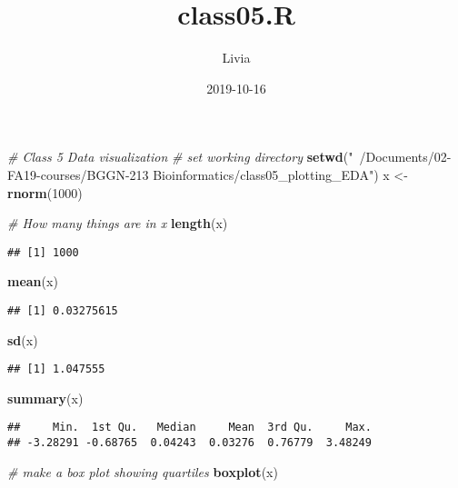 \documentclass[]{article}
\title{class05.R}
\author{Livia}
\date{2019-10-16}
\newenvironment{Shaded}{\begin{snugshade}}{\end{snugshade}}
\newcommand{\CommentTok}[1]{\textcolor[rgb]{0.56,0.35,0.01}{\textit{#1}}}
\newcommand{\DecValTok}[1]{\textcolor[rgb]{0.00,0.00,0.81}{#1}}
\newcommand{\KeywordTok}[1]{\textcolor[rgb]{0.13,0.29,0.53}{\textbf{#1}}}
\newcommand{\NormalTok}[1]{#1}
\newcommand{\StringTok}[1]{\textcolor[rgb]{0.31,0.60,0.02}{#1}}
\begin{document}
\maketitle

\begin{Shaded}
\begin{Highlighting}[]
\CommentTok{# Class 5 Data visualization}
\CommentTok{# set working directory}
\KeywordTok{setwd}\NormalTok{(}\StringTok{"~/Documents/02-FA19-courses/BGGN-213 Bioinformatics/class05_plotting_EDA"}\NormalTok{)}
\NormalTok{x <-}\StringTok{ }\KeywordTok{rnorm}\NormalTok{(}\DecValTok{1000}\NormalTok{)}

\CommentTok{# How many things are in x}
\KeywordTok{length}\NormalTok{(x)}
\end{Highlighting}
\end{Shaded}

\begin{verbatim}
## [1] 1000
\end{verbatim}

\begin{Shaded}
\begin{Highlighting}[]
\KeywordTok{mean}\NormalTok{(x)}
\end{Highlighting}
\end{Shaded}

\begin{verbatim}
## [1] 0.03275615
\end{verbatim}

\begin{Shaded}
\begin{Highlighting}[]
\KeywordTok{sd}\NormalTok{(x)}
\end{Highlighting}
\end{Shaded}

\begin{verbatim}
## [1] 1.047555
\end{verbatim}

\begin{Shaded}
\begin{Highlighting}[]
\KeywordTok{summary}\NormalTok{(x)}
\end{Highlighting}
\end{Shaded}

\begin{verbatim}
##     Min.  1st Qu.   Median     Mean  3rd Qu.     Max. 
## -3.28291 -0.68765  0.04243  0.03276  0.76779  3.48249
\end{verbatim}

\begin{Shaded}
\begin{Highlighting}[]
\CommentTok{# make a box plot showing quartiles}
\KeywordTok{boxplot}\NormalTok{(x)}
\end{Highlighting}
\end{Shaded}
\end{document}
